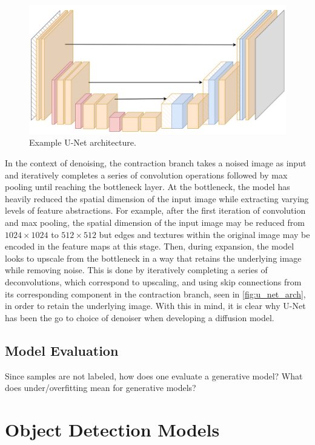 \documentclass[11pt]{article}
\begin{document}
\begin{figure}[t]
    \centering
    \includegraphics[width=\columnwidth]{./figures/generative_models/unet.png}
    \caption{Example U-Net architecture. }
    \label{fig:u_net_arch}
\end{figure}

In the context of denoising, the contraction branch takes a noised image as input and iteratively completes a series of convolution operations followed by max pooling until reaching the bottleneck layer. At the bottleneck, the model has heavily reduced the spatial dimension of the input image while extracting varying levels of feature abstractions. For example, after the first iteration of convolution and max pooling, the spatial dimension of the input image may be reduced from $1024\times1024$ to $512\times512$ but edges and textures within the original image may be encoded in the feature maps at this stage. Then, during expansion, the model looks to upscale from the bottleneck in a way that retains the underlying image while removing noise. This is done by iteratively completing a series of deconvolutions, which correspond to upscaling, and using skip connections from its corresponding component in the contraction branch, seen in \autoref{fig:u_net_arch}, in order to retain the underlying image. With this in mind, it is clear why U-Net has been the go to choice of denoiser when developing a diffusion model.

\subsection{Model Evaluation}
\TODO{} Since samples are not labeled, how does one evaluate a generative model? What does under/overfitting mean for generative models?

\section{Object Detection Models}
\end{document}
